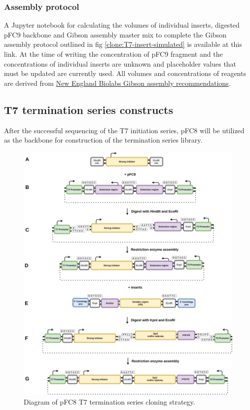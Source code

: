 \documentclass[11pt]{article}
\begin{document}
\subsubsection{Assembly protocol}

A Jupyter notebook for calculating the volumes of individual inserts, digested pFC9 backbone and Gibson assembly master mix to complete the Gibson assembly protocol outlined in fig \ref{clone:T7-insert-simulated} is available at this link. At the time of writing the concentration of pFC9 fragment and the concentrations of individual inserts are unknown and placeholder values that must be updated are currently used. All volumes and concentrations of reagents are derived from \href{https://www.neb.com/protocols/2012/12/11/gibson-assembly-protocol-e5510}{New England Biolabs Gibson assembly recommendations}.


\subsection{T7 termination series constructs}

After the successful sequencing of the T7 initiation series, pFC8 will be utilized as the backbone for construction of the termination series library. 

\begin{figure}[H]
	\includegraphics[width=15cm]{images/cloning_diagrams/construct_diagrams-T7-termination-series.png}
	\centering
	\caption{Diagram of pFC8 T7 termination series cloning strategy.}
	\label{clone:T7-term}
	
\end{figure}
\end{document}

